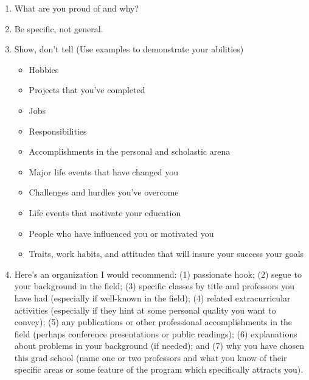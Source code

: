 \documentclass[a4paper,12pt]{article}%
\begin{document}
\begin{enumerate}
	  \hrulefill
	  
	  \hrulefill
	  
\item What are you proud of and why?
\item 	Be specific, not general.
\item Show, don't tell (Use examples to demonstrate your abilities)
\begin{itemize}
	\item Hobbies 
	\item Projects that you've completed
	\item Jobs
	\item Responsibilities
	\item Accomplishments in the personal and scholastic arena
	\item Major life events that have changed you
	\item Challenges and hurdles you've overcome
	\item Life events that motivate your education
	\item People who have influenced you or motivated you 
	\item Traits, work habits, and attitudes that will insure your success your goals
\end{itemize}

	  \hrulefill
	  
	  \hrulefill

\item   Here's an organization I would recommend: (1) passionate hook; (2) segue to your background in the field; (3) specific classes by title and professors you have had (especially if well-known in the field); (4) related extracurricular activities (especially if they hint at some personal quality you want to convey); (5) any publications or other professional accomplishments in the field (perhaps conference presentations or public readings); (6) explanations about problems in your background (if needed); and (7) why you have chosen this grad school (name one or two professors and what you know of their specific areas or some feature of the program which specifically attracts you).
	\end{enumerate}		
	  \hrulefill
	  
	  \hrulefill 
	  
	  \hrulefill
\end{document}
